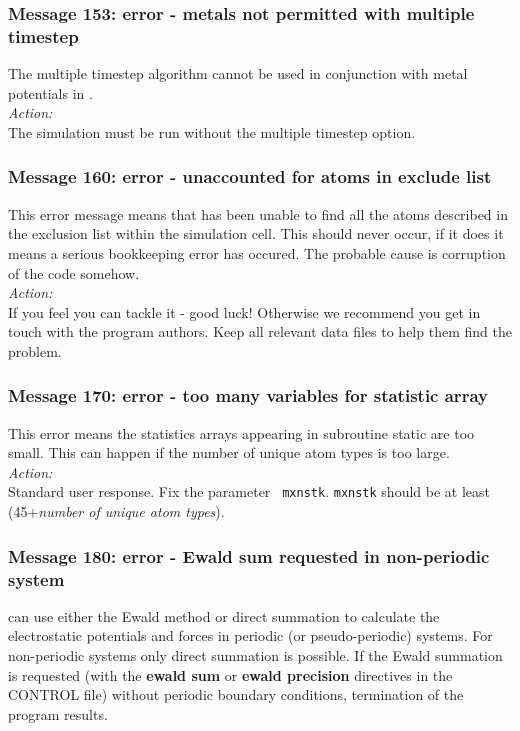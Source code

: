 \subsubsection*{Message 153: error - metals not permitted with multiple timestep}

The multiple timestep algorithm  cannot be used in conjunction with
metal potentials in \D{}. \\

\noindent
{\em Action:} \\
The simulation must be run without the multiple timestep option.

\subsubsection*{Message 160: error - unaccounted for atoms in exclude list }

This error message means that \D{} has been unable to find all the
atoms described in the exclusion list within the simulation cell. This
should never occur, if it does it means a serious bookkeeping error has
occured. The probable cause is corruption of the code somehow. \\ 

\noindent
{\em Action:} \\ 
If you feel you can tackle it - good luck!  Otherwise we recommend you
get in touch with the program authors. Keep all relevant data files to
help them find the problem.

\subsubsection*{Message 170: error - too many variables for statistic array }

This error means the statistics arrays appearing in subroutine {\sc
static} are too small. This can happen if the number of unique atom
types is too large. \\ 

\noindent
{\em Action:} \\ Standard user response. Fix the parameter {\tt
mxnstk}.  {\tt mxnstk} should be at least (45+{\em number of unique
atom types}).

\subsubsection*{Message 180: error - Ewald sum requested in
non-periodic system}

\D{} can use either the Ewald method or direct summation to
calculate the electrostatic potentials and forces in periodic (or
pseudo-periodic) systems.  For non-periodic systems only direct
summation is possible. If the Ewald summation  is requested (with the
{\bf ewald sum} or {\bf ewald precision} directives in the CONTROL file) without periodic boundary
conditions, termination of the program results. \\

